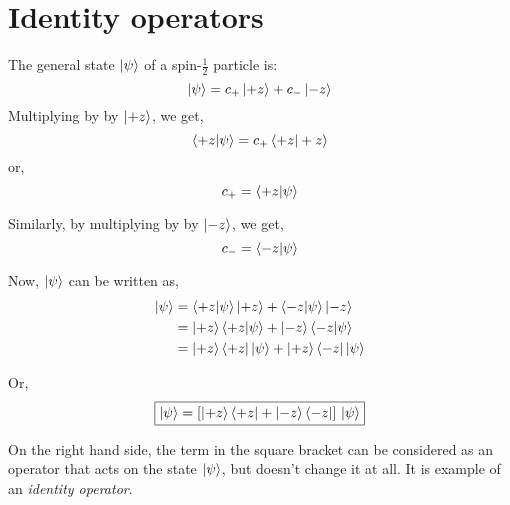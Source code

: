 \section{Identity operators}
The general state $\ket{\psi}$ of a spin-$\frac{1}{2}$ particle is:
\begin{equation*}
\ket{\psi} =c_{+} \ket{+z} + c_{-}\ket{-z}
\end{equation*}
Multiplying by by $\ket{+z}$, we get,
\begin{equation*}
\braket{+z | \psi} = c_{+} \braket{+z | +z} 
\end{equation*}
or,
\begin{equation*}
c_{+} = \braket{+z | \psi}
\end{equation*}

Similarly, by multiplying by by $\ket{-z}$, we get,
\begin{equation*}
c_{-} = \braket{-z | \psi}
\end{equation*}

Now, $\ket{\psi}$ can be written as,
\begin{align*}
\ket{\psi} &= \braket{+z | \psi} \ket{+z} + \braket{-z | \psi} \ket{-z}  \\
%
&= \ket{+z} \braket{+z | \psi} + \ket{-z} \braket{-z | \psi} \\
%
&= \ket{+z} \bra{+z} \ket{\psi} + \ket{+z} \bra{-z} \ket{\psi}
\end{align*}

Or,
\begin{equation*}
\boxed{
\ket{\psi} = \left[ \ket{+z} \bra{+z} + \ket{-z} \bra{-z} \right]\, \ket{\psi}
}
\end{equation*}

On the right hand side, the term in the square bracket can be considered as an 
operator that acts on the state $\ket{\psi}$, but doesn't change it at all. It is 
example of an \emph{identity operator}.
